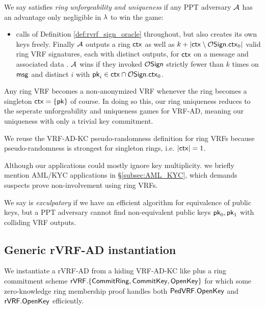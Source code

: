 \begin{definition}
We say \rVRF satisfies {\em ring unforgeability and uniqueness} if
any PPT adversary $\mathcal{A}$ has an advantage only
 negligible in $\lambda$ to win the game:
\begin{itemize}
\item[]
 \adv calls  of Definition \ref{def:rvrf_sign_oracle} throughout,
 but also creates its own keys freely.
 Finally $\mathcal{A}$ outputs a ring $\mathsf{ctx}$ as well as
 $k + |\mathsf{ctx} \setminus \mathcal{O}\mathsf{Sign}.\mathsf{ctx}_0|$ valid ring VRF signatures,
  each with distinct outputs,    %
 for $\mathsf{ctx}$ on a message \msg and associated data \aux.
 $\mathcal{A}$ wins if they invoked $\mathcal{O}\mathsf{Sign}$ strictly fewer than $k$ times on $\mathsf{msg}$  %
  and distinct $i$ with $\mathsf{pk}_i \in \mathsf{ctx} \cap \mathcal{O}\mathsf{Sign}.\mathsf{ctx}_0$.
\end{itemize}
\end{definition}
 
Any ring VRF becomes a non-anonymized VRF whenever
 the ring becomes a singleton $\mathsf{ctx} = \{ \mathsf{pk} \}$ of course.
In doing so this, our ring uniqueness reduces to
 the seperate unforgeability and uniqueness games for VRF-AD,
meaning our uniqueness with only a trivial key commitment.

We reuse the VRF-AD-KC pseudo-randomness definition for ring VRFs
because pseudo-randomness is strongest for singleton rings, i.e. $|\mathsf{ctx}| = 1$.

\smallskip 

Although our applications could mostly ignore key multiplicity. 
we briefly mention AML/KYC applications in \S\ref{subsec:AML_KYC},
which demands suspects prove non-involvement using ring VRFs.

\begin{definition}
We say \rVRF is {\em exculpatory} if we have an efficient algorithm
for equivalence of public keys, but a PPT adversary \adv cannot
find non-equivalent public keys $\mathsf{pk}_0,\mathsf{pk}_1$ with colliding VRF outputs.
\end{definition} 


\subsection{Generic rVRF-AD instantiation}

We instantiate a rVRF-AD from a hiding VRF-AD-KC like \PedVRF plus
a ring commitment scheme
 ${\mathsf{rVRF}}.\{ {\mathsf{CommitRing}}, {\mathsf{CommitKey}}, {\mathsf{OpenKey}} \}$
for which some zero-knowledge ring membership proof handles both
 ${\mathsf{PedVRF}}.{\mathsf{OpenKey}}$ and ${\mathsf{rVRF}}.{\mathsf{OpenKey}}$
efficiently.

